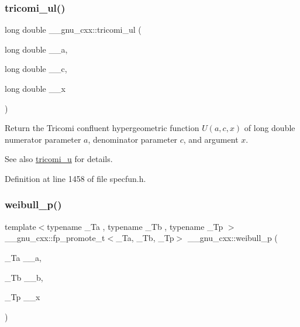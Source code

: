 \subsubsection{\texorpdfstring{tricomi\+\_\+ul()}{tricomi\_ul()}}
{\footnotesize\ttfamily long double \+\_\+\+\_\+gnu\+\_\+cxx\+::tricomi\+\_\+ul (\begin{DoxyParamCaption}\item[{long double}]{\+\_\+\+\_\+a,  }\item[{long double}]{\+\_\+\+\_\+c,  }\item[{long double}]{\+\_\+\+\_\+x }\end{DoxyParamCaption})\hspace{0.3cm}{\ttfamily [inline]}}

Return the Tricomi confluent hypergeometric function $ U(a,c,x) $ of {\ttfamily long double} numerator parameter $ a $, denominator parameter $ c $, and argument $ x $.

\begin{DoxySeeAlso}{See also}
\hyperlink{group__gnu__math__spec__func_gaf51a13fad85006e4d65c5b117e49f7d8}{tricomi\+\_\+u} for details. 
\end{DoxySeeAlso}


Definition at line 1458 of file specfun.\+h.

\mbox{\label{group__gnu__math__spec__func_ga9afb3065fea6ef3a91126d67f726f7af}} 
\subsubsection{\texorpdfstring{weibull\+\_\+p()}{weibull\_p()}}
{\footnotesize\ttfamily template$<$typename \+\_\+\+Ta , typename \+\_\+\+Tb , typename \+\_\+\+Tp $>$ \\
\+\_\+\+\_\+gnu\+\_\+cxx\+::fp\+\_\+promote\+\_\+t$<$\+\_\+\+Ta, \+\_\+\+Tb, \+\_\+\+Tp$>$ \+\_\+\+\_\+gnu\+\_\+cxx\+::weibull\+\_\+p (\begin{DoxyParamCaption}\item[{\+\_\+\+Ta}]{\+\_\+\+\_\+a,  }\item[{\+\_\+\+Tb}]{\+\_\+\+\_\+b,  }\item[{\+\_\+\+Tp}]{\+\_\+\+\_\+x }\end{DoxyParamCaption})\hspace{0.3cm}{\ttfamily [inline]}}



